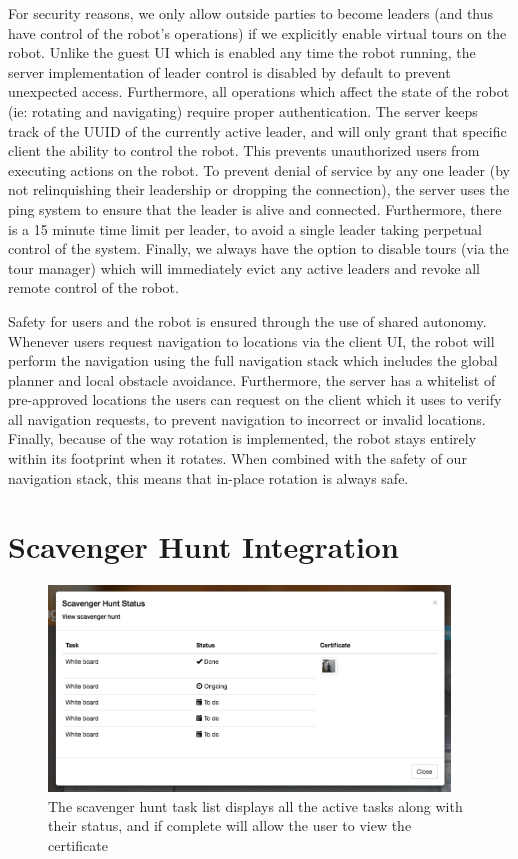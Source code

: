 \documentclass[
  oneside,
  11pt, a4paper,
  footinclude=true,
  headinclude=true,
  cleardoublepage=empty
]{article}
\begin{document}
For security reasons, we only allow outside parties to become leaders (and thus
have control of the robot's operations) if we explicitly enable virtual tours
on the robot. Unlike the guest UI which is enabled any time the robot running,
the server implementation of leader control is disabled by default to prevent
unexpected access. Furthermore, all operations which affect the state of the
robot (ie: rotating and navigating) require proper authentication. The server
keeps track of the UUID of the currently active leader, and will only grant
that specific client the ability to control the robot. This prevents
unauthorized users from executing actions on the robot. To prevent denial of
service by any one leader (by not relinquishing their leadership or dropping
the connection), the server uses the ping system to ensure that the leader is
alive and connected. Furthermore, there is a 15 minute time limit per leader,
to avoid a single leader taking perpetual control of the system. Finally, we
always have the option to disable tours (via the tour manager) which will
immediately evict any active leaders and revoke all remote control of the
robot.

Safety for users and the robot is ensured through the use of shared autonomy.
Whenever users request navigation to locations via the client UI, the robot
will perform the navigation using the full navigation stack which includes the
global planner and local obstacle avoidance. Furthermore, the server
has a whitelist of pre-approved locations the users can request on the
client which it uses to verify all navigation requests, to prevent navigation
to incorrect or invalid locations. Finally, because of the way rotation is
implemented, the robot stays entirely within its footprint when it rotates.
When combined with the safety of our navigation stack, this means that in-place
rotation is always safe.


\section{Scavenger Hunt Integration}\label{sec:scav}

\begin{figure}
  \centering
  \includegraphics[width=0.95\textwidth]{scav_certs}
  \caption{The scavenger hunt task list displays all the active tasks along
  with their status, and if complete will allow the user to view the
  certificate}
  \label{fig:scav}
\end{figure}
\end{document}
